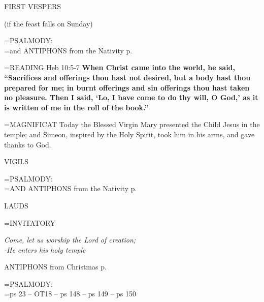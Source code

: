 \begin{flushleft}\normalsize FIRST VESPERS\\\end{flushleft} (if the feast falls on Sunday)

\hangindent=\parindent \small{PSALMODY:}\\
\hangindent=\parindent  and ANTIPHONS from the Nativity p. \pageref{christmas:nativity}\vspace{0.5em}

\hangindent=\parindent \small{READING} Heb 10:5-7 \textbf{When Christ came into the world, he said, “Sacrifices and offerings thou hast not desired, but a body hast thou prepared for me; in burnt offerings and sin offerings thou hast taken no pleasure. Then I said, ‘Lo, I have come to do thy will, O God,’ as it is written of me in the roll of the book.”\\}
 
\hangindent=\parindent \small{MAGNIFICAT  Today the Blessed Virgin Mary presented the Child Jesus in the temple; and Simeon, inspired by the Holy Spirit, took him in his arms, and gave thanks to God.\\}
 
\begin{flushleft}\normalsize VIGILS\\\end{flushleft}

\hangindent=\parindent \small{PSALMODY:}\\
\hangindent=\parindent  AND ANTIPHONS from the Nativity p. \pageref{christmas:nativity}\vspace{0.5em}

\begin{flushleft}\normalsize LAUDS\\\end{flushleft}

\hangindent=\parindent \small{INVITATORY}
\begin{center}
\textit{Come, let us worship the Lord of creation;\\}
\textit{-He enters his holy temple\\}
\end{center}

ANTIPHONS from Christmas p. \pageref{christmas:nativity}

\hangindent=\parindent \small{PSALMODY:}\\
\hangindent=\parindent  ps 23 -- OT18 -- ps 148 -- ps 149 -- ps 150\vspace{0.5em}

